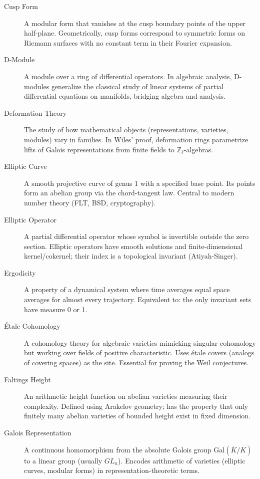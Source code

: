 \begin{description}
    \item[Cusp Form] A modular form that vanishes at the cusp boundary points of the upper half-plane. Geometrically, cusp forms correspond to symmetric forms on Riemann surfaces with no constant term in their Fourier expansion.

    \item[D-Module] A module over a ring of differential operators. In algebraic analysis, D-modules generalize the classical study of linear systems of partial differential equations on manifolds, bridging algebra and analysis.

    \item[Deformation Theory] The study of how mathematical objects (representations, varieties, modules) vary in families. In Wiles' proof, deformation rings parametrize lifts of Galois representations from finite fields to $\mathbb{Z}_\ell$-algebras.

    \item[Elliptic Curve] A smooth projective curve of genus 1 with a specified base point. Its points form an abelian group via the chord-tangent law. Central to modern number theory (FLT, BSD, cryptography).

    \item[Elliptic Operator] A partial differential operator whose symbol is invertible outside the zero section. Elliptic operators have smooth solutions and finite-dimensional kernel/cokernel; their index is a topological invariant (Atiyah-Singer).

    \item[Ergodicity] A property of a dynamical system where time averages equal space averages for almost every trajectory. Equivalent to: the only invariant sets have measure 0 or 1.

    \item[Étale Cohomology] A cohomology theory for algebraic varieties mimicking singular cohomology but working over fields of positive characteristic. Uses étale covers (analogs of covering spaces) as the site. Essential for proving the Weil conjectures.

    \item[Faltings Height] An arithmetic height function on abelian varieties measuring their complexity. Defined using Arakelov geometry; has the property that only finitely many abelian varieties of bounded height exist in fixed dimension.

    \item[Galois Representation] A continuous homomorphism from the absolute Galois group $\mathrm{Gal}(\overline{K}/K)$ to a linear group (usually $GL_n$). Encodes arithmetic of varieties (elliptic curves, modular forms) in representation-theoretic terms.


\end{description}

